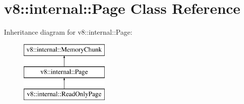 \hypertarget{classv8_1_1internal_1_1Page}{}\section{v8\+:\+:internal\+:\+:Page Class Reference}
\label{classv8_1_1internal_1_1Page}
Inheritance diagram for v8\+:\+:internal\+:\+:Page\+:\begin{figure}[H]
\begin{center}
\leavevmode
\includegraphics[height=3.000000cm]{classv8_1_1internal_1_1Page}
\end{center}
\end{figure}
